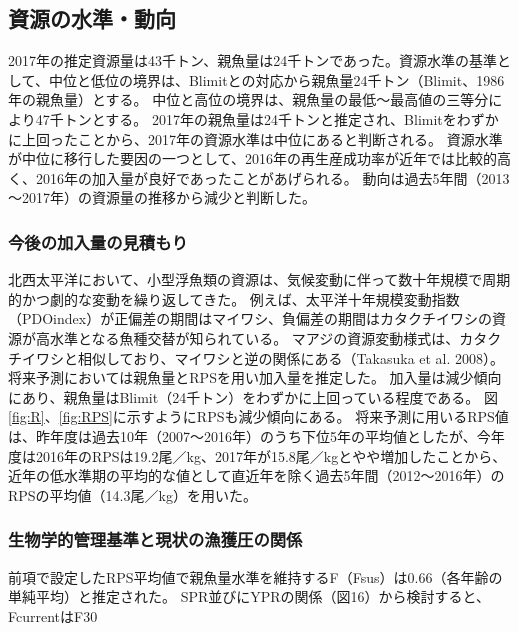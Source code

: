 \subsection{資源の水準・動向}
2017年の推定資源量は{43千トン}、親魚量は{24千トン}であった。資源水準の基準として、中位と低位の境界は、Blimitとの対応から親魚量{24千トン}（Blimit、1986年の親魚量）とする。
中位と高位の境界は、親魚量の最低～最高値の三等分により{47千トン}とする。
{2017年}の親魚量は{24千トン}と推定され、Blimitをわずかに上回ったことから、{2017年}の資源水準は{中位}にあると判断される。
資源水準が中位に移行した要因の一つとして、{2016年}の再生産成功率が近年では比較的高く、{2016年}の加入量が良好であったことがあげられる。
動向は過去5年間（{2013～2017年}）の資源量の推移から減少と判断した。


\subsubsection{今後の加入量の見積もり}
北西太平洋において、小型浮魚類の資源は、気候変動に伴って数十年規模で周期的かつ劇的な変動を繰り返してきた。
例えば、太平洋十年規模変動指数（PDOindex）が正偏差の期間はマイワシ、負偏差の期間はカタクチイワシの資源が高水準となる魚種交替が知られている。
マアジの資源変動様式は、カタクチイワシと相似しており、マイワシと逆の関係にある（Takasuka et al. 2008）。
将来予測においては親魚量とRPSを用い加入量を推定した。
加入量は減少傾向にあり、親魚量はBlimit（24千トン）をわずかに上回っている程度である。
図\ref{fig:R}、\ref{fig:RPS}に示すようにRPSも減少傾向にある。
将来予測に用いるRPS値は、昨年度は過去10年（2007～2016年）のうち下位5年の平均値としたが、今年度は2016年のRPSは19.2尾／kg、2017年が15.8尾／kgとやや増加したことから、近年の低水準期の平均的な値として直近年を除く過去5年間（2012～2016年）のRPSの平均値（14.3尾／kg）を用いた。

\subsubsection{生物学的管理基準と現状の漁獲圧の関係}
 前項で設定したRPS平均値で親魚量水準を維持するF（Fsus）は0.66（各年齢の単純平均）と推定された。
SPR並びにYPRの関係（図16）から検討すると、FcurrentはF30%